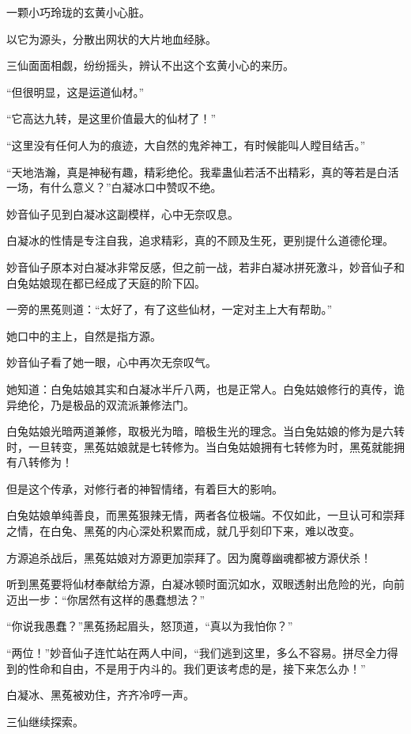 \begin{this_body}
一颗小巧玲珑的玄黄小心脏。

以它为源头，分散出网状的大片地血经脉。

三仙面面相觑，纷纷摇头，辨认不出这个玄黄小心的来历。

“但很明显，这是运道仙材。”

“它高达九转，是这里价值最大的仙材了！”

“这里没有任何人为的痕迹，大自然的鬼斧神工，有时候能叫人瞠目结舌。”

“天地浩瀚，真是神秘有趣，精彩绝伦。我辈蛊仙若活不出精彩，真的等若是白活一场，有什么意义？”白凝冰口中赞叹不绝。

妙音仙子见到白凝冰这副模样，心中无奈叹息。

白凝冰的性情是专注自我，追求精彩，真的不顾及生死，更别提什么道德伦理。

妙音仙子原本对白凝冰非常反感，但之前一战，若非白凝冰拼死激斗，妙音仙子和白兔姑娘现在都已经成了天庭的阶下囚。

一旁的黑菟则道：“太好了，有了这些仙材，一定对主上大有帮助。”

她口中的主上，自然是指方源。

妙音仙子看了她一眼，心中再次无奈叹气。

她知道：白兔姑娘其实和白凝冰半斤八两，也是正常人。白兔姑娘修行的真传，诡异绝伦，乃是极品的双流派兼修法门。

白兔姑娘光暗两道兼修，取极光为暗，暗极生光的理念。当白兔姑娘的修为是六转时，一旦转变，黑菟姑娘就是七转修为。当白兔姑娘拥有七转修为时，黑菟就能拥有八转修为！

但是这个传承，对修行者的神智情绪，有着巨大的影响。

白兔姑娘单纯善良，而黑菟狠辣无情，两者各位极端。不仅如此，一旦认可和崇拜之情，在白兔、黑菟的内心深处积累而成，就几乎刻印下来，难以改变。

方源追杀战后，黑菟姑娘对方源更加崇拜了。因为魔尊幽魂都被方源伏杀！

听到黑菟要将仙材奉献给方源，白凝冰顿时面沉如水，双眼透射出危险的光，向前迈出一步：“你居然有这样的愚蠢想法？”

“你说我愚蠢？”黑菟扬起眉头，怒顶道，“真以为我怕你？”

“两位！”妙音仙子连忙站在两人中间，“我们逃到这里，多么不容易。拼尽全力得到的性命和自由，不是用于内斗的。我们更该考虑的是，接下来怎么办！”

白凝冰、黑菟被劝住，齐齐冷哼一声。

三仙继续探索。


\end{this_body}
